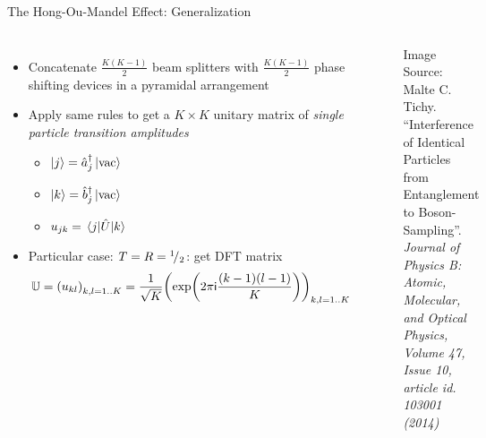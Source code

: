 \begin{frame}[t]{The Hong-Ou-Mandel Effect: Generalization}
%
\begin{columns}
\begin{itemize}
\item Concatenate $\frac{K(K-1)}{2}$ beam splitters with $\frac{K(K-1)}{2}$ phase shifting devices in a pyramidal arrangement
\item Apply same rules to get a $K \times K$ unitary matrix \matU of \emph{single particle transition amplitudes}
	\begin{itemize}
	\item $\ket{j} = \cre_j \vac$
	\item $\ket{k} = \cre[b]_j \vac$
	\item $u_{jk} = \matrixel{j}{\opU}{k}$
	\end{itemize}
\item Particular case: $T = R = \smallfrac{1}{2}$: get DFT matrix
	\begin{align*}
		\matU
	=
		\qty( u_{kl} )_{k, l = 1..K}
	&=
		\frac{1}{\sqrt{K}}
		\qty( \exp(2\pi\iunit \frac{(k-1)(l-1)}{K}) )_{k, l = 1..K}
	\label{eqn:DefDFT}
	\end{align*}
\end{itemize}
%
%
	\includegraphics[width=\linewidth]{./gfx/HOM-full}
	\begin{minipage}{\linewidth}
		\tiny
		Image Source:\\
		Malte C. Tichy. \enquote{Interference of Identical Particles from Entanglement to Boson-Sampling}.
		\emph{Journal of Physics B: Atomic, Molecular, and Optical Physics, Volume 47, Issue 10, article id. 103001 (2014)}
	\end{minipage}
\end{columns}
%
\end{frame}

